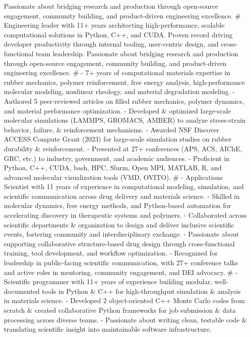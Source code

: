 Passionate about bridging research and production through open-source engagement, community building, and product-driven engineering excellence.
#
Engineering leader with 11+ years architecting high-performance, scalable computational solutions in Python, C++, and CUDA.
Proven record driving developer productivity through internal tooling, user-centric design, and cross-functional team leadership.
Passionate about bridging research and production through open-source engagement, community building, and product-driven engineering excellence.
#
- 7+ years of computational materials expertise in rubber mechanics, polymer reinforcement, free energy analysis, high-performance molecular modeling, nonlinear rheology, and material degradation modeling.
- Authored 5 peer-reviewed articles on filled rubber mechanics, polymer dynamics, and material performance optimization.
- Developed \& optimized large-scale molecular simulations (LAMMPS, GROMACS, AMBER) to analyze stress-strain behavior, failure, \& reinforcement mechanisms.
- Awarded NSF Discover ACCESS Compute Grant (2023) for large-scale simulation studies on rubber durability \& reinforcement.
- Presented at 27+ conferences (APS, ACS, AIChE, GRC, etc.) to industry, government, and academic audiences.
- Proficient in Python, C++, CUDA, bash, HPC, Slurm, Open MPI, MATLAB, R, and advanced molecular visualization tools (VMD, OVITO).
#
- Applications Scientist with 11 years of experience in computational modeling, simulation, and scientific communication across drug delivery and materials science.
- Skilled in molecular dynamics, free energy methods, and Python-based automation for accelerating discovery in therapeutic systems and polymers.
- Collaborated across scientific departments \& organization to design and deliver inclusive scientific events, fostering community and interdisciplinary exchange.
- Passionate about supporting collaborative structure-based drug design through cross-functional training, tool development, and workflow optimization.
- Recognized for leadership in public-facing scientific communication, with 27+ conference talks and active roles in mentoring, community engagement, and DEI advocacy.
#
- Scientific programmer with 11+ years of experience building modular, well-documented tools in Python \& C++ for high-throughput simulation \& analysis in materials science.
- Developed 2 object-oriented C++ Monte Carlo codes from scratch \& created collaborative Python frameworks for job submission \& data processing across diverse teams.
- Passionate about writing clean, testable code \& translating scientific insight into maintainable software infrastructure.

